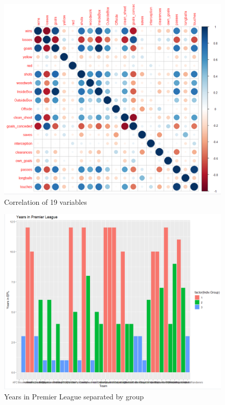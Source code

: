 \documentclass[12pt,english]{article}
\begin{document}
\begin{figure}[ht]
\centering
\bigskip{}
\includegraphics[width=1.2\linewidth]{Circles.PNG}
\caption{Correlation of 19 variables}
\label{fig:fig1}
\end{figure}

\begin{figure}[ht]
\centering
\bigskip{}
\includegraphics[width=1.2\linewidth]{Groups.PNG}
\caption{Years in Premier League separated by group}
\label{fig:fig1}
\end{figure}
\end{document}
